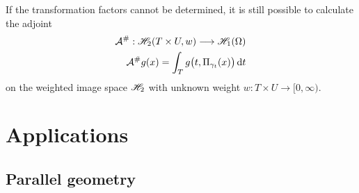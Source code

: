 \documentclass{amsart}
\begin{document}
%
If the transformation factors cannot be determined, it is still possible to calculate the adjoint
%
\begin{align}
 {\ensuremath{\mathcal{A}}}^\#: {\mathscr{H}}_2(T \times U, w) \longrightarrow {\ensuremath{\mathscr{H}}}_1(\Omega) \notag \\
 \label{eq:general:backproj_onedir_weighted}
 {\ensuremath{\mathcal{A}}}^\# g(x) = \int_T g\big(t, \Pi_{\gamma_t}(x)\big)\, \mathrm{d} t
\end{align}
%
on the weighted image space ${\mathscr{H}}_2$ with unknown weight $w: T \times U \to [0, \infty)$.%
\vspace{5ex}%





\section{Applications}
\label{sec:applications}


\subsection{Parallel geometry}
\label{sec:applications:parbeam}
\end{document}

